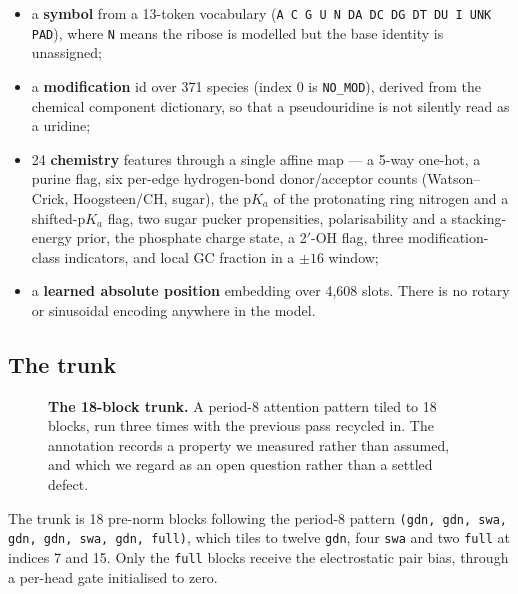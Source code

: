 \documentclass[11pt,a4paper]{article}
\begin{document}
\begin{itemize}
\item a \textbf{symbol} from a 13-token vocabulary
  (\texttt{A C G U N DA DC DG DT DU I UNK PAD}), where \texttt{N} means
  the ribose is modelled but the base identity is unassigned;
\item a \textbf{modification} id over 371 species (index 0 is
  \texttt{NO\_MOD}), derived from the chemical component dictionary, so
  that a pseudouridine is not silently read as a uridine;
\item 24 \textbf{chemistry} features through a single affine map ---
  a 5-way one-hot, a purine flag, six per-edge hydrogen-bond
  donor/acceptor counts (Watson--Crick, Hoogsteen/CH, sugar), the p$K_a$
  of the protonating ring nitrogen and a shifted-p$K_a$ flag, two sugar
  pucker propensities, polarisability and a stacking-energy prior, the
  phosphate charge state, a 2$'$-OH flag, three modification-class
  indicators, and local GC fraction in a $\pm16$ window;
\item a \textbf{learned absolute position} embedding over 4{,}608 slots.
  There is no rotary or sinusoidal encoding anywhere in the model.
\end{itemize}

\subsection{The trunk}

\begin{figure}[H]\centering
\resizebox{\textwidth}{!}{}
\caption{\textbf{The 18-block trunk.} A period-8 attention pattern tiled
to 18 blocks, run three times with the previous pass recycled in. The
annotation records a property we measured rather than assumed, and which
we regard as an open question rather than a settled defect.}
\label{fig:trunk}
\end{figure}

The trunk is 18 pre-norm blocks following the period-8 pattern
\texttt{(gdn, gdn, swa, gdn, gdn, swa, gdn, full)}, which tiles to twelve
\texttt{gdn}, four \texttt{swa} and two \texttt{full} at indices 7
and 15. Only the \texttt{full} blocks receive the electrostatic pair
bias, through a per-head gate initialised to zero.
\end{document}
